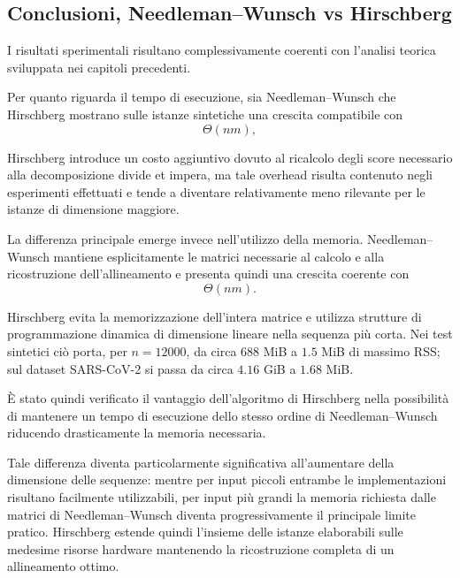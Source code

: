 \subsection{Conclusioni, Needleman--Wunsch vs Hirschberg}

I risultati sperimentali risultano complessivamente coerenti con l'analisi teorica sviluppata nei capitoli precedenti.

Per quanto riguarda il tempo di esecuzione, sia Needleman--Wunsch che Hirschberg mostrano sulle istanze sintetiche una crescita compatibile con
\[
    \Theta(nm),
\]

Hirschberg introduce un costo aggiuntivo dovuto al ricalcolo degli score necessario alla decomposizione divide et impera, ma tale overhead
risulta contenuto negli esperimenti effettuati e tende a diventare relativamente meno rilevante per le istanze di dimensione maggiore.

La differenza principale emerge invece nell'utilizzo della memoria. Needleman--Wunsch mantiene esplicitamente le matrici necessarie al calcolo
e alla ricostruzione dell'allineamento e presenta quindi una crescita coerente con
\[
    \Theta(nm).
\]

Hirschberg evita la memorizzazione dell'intera matrice e utilizza strutture di programmazione dinamica di dimensione lineare nella sequenza più corta.
Nei test sintetici ciò porta, per $n=12000$, da circa $688$ MiB a $1.5$ MiB di massimo RSS; sul dataset SARS-CoV-2 si passa da circa $4.16$ GiB a $1.68$ MiB.

È stato quindi verificato il vantaggio dell'algoritmo di Hirschberg nella possibilità di mantenere un tempo di esecuzione dello stesso ordine
di Needleman--Wunsch riducendo drasticamente la memoria necessaria.

Tale differenza diventa particolarmente significativa all'aumentare della dimensione delle sequenze: mentre per input piccoli entrambe le implementazioni
risultano facilmente utilizzabili, per input più grandi la memoria richiesta dalle matrici di Needleman--Wunsch diventa progressivamente il principale
limite pratico.
Hirschberg estende quindi l'insieme delle istanze elaborabili sulle medesime risorse hardware mantenendo la ricostruzione completa di un allineamento ottimo.
